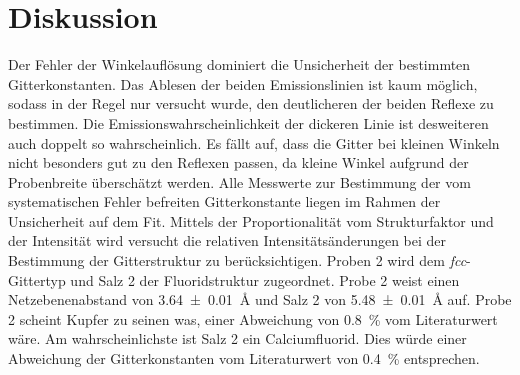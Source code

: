 \section{Diskussion}\label{sec:Diskussion}
Der Fehler der Winkelauflösung  dominiert die Unsicherheit der bestimmten
Gitterkonstanten. 
Das Ablesen der beiden Emissionslinien ist kaum möglich,
sodass in der Regel nur versucht wurde, den deutlicheren der beiden Reflexe zu bestimmen.
Die Emissionswahrscheinlichkeit der dickeren Linie ist desweiteren auch
doppelt so wahrscheinlich. 
Es fällt auf, dass die Gitter bei kleinen Winkeln nicht besonders gut zu den
Reflexen passen, da kleine Winkel aufgrund der Probenbreite überschätzt werden.
Alle Messwerte zur Bestimmung der vom systematischen Fehler befreiten
Gitterkonstante liegen im Rahmen der Unsicherheit auf dem Fit.
Mittels der Proportionalität vom Strukturfaktor und der Intensität wird
versucht die relativen Intensitätsänderungen bei der Bestimmung der
Gitterstruktur zu berücksichtigen.
Proben 2 wird dem \textit{fcc}-Gittertyp und Salz 2 der Fluoridstruktur zugeordnet. 
Probe 2 weist einen Netzebenenabstand von \SI{3.64 +- 0.01}{\angstrom}
und Salz 2 von \SI{5.48 +- 0.01}{\angstrom} auf.
Probe 2 scheint Kupfer zu seinen was, einer Abweichung von \SI{0.8}{\percent} vom Literaturwert
\cite{kupfer} wäre.
Am wahrscheinlichste ist Salz 2 ein Calciumfluorid. Dies würde einer Abweichung
der Gitterkonstanten vom Literaturwert \cite{CaF2} von \SI{0.4}{\percent} entsprechen.

